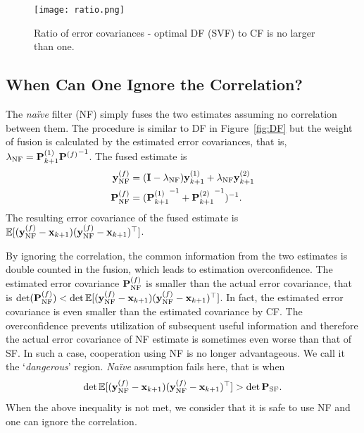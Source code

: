 \begin{figure}[htbp]
\centering
\texttt{[image: ratio.png]}
\caption{Ratio of error covariances - optimal DF (SVF) to CF is no larger than one.}
\label{ratio}
\end{figure}

\subsection{When Can One Ignore the Correlation?}
\label{sec:nf}
The \textit{na\"ive} filter (NF) simply fuses the two estimates assuming no correlation between them. The procedure is similar to DF in Figure~\ref{fig:DF} but the weight of fusion is calculated by the estimated error covariances, that is, $\lambda_\text{NF}={{\bf P}^{(1)}_{k+1}}{{\bf P}^{(f)}}^{-1}$. The fused estimate is
\begin{equation}
\begin{split}
{\bf y}^{(f)}_{\text{NF}}&=({\bf I}-\lambda_\text{NF}){\bf y}^{(1)}_{k+1}+\lambda_\text{NF}{\bf y}^{(2)}_{k+1} \\
{\bf P}^{(f)}_{\text{NF}}&=({{\bf P}^{(1)}_{k+1}}^{-1}+{{\bf P}^{(2)}_{k+1}}^{-1})^{-1}.
\end{split}
\end{equation}
The resulting error covariance of the fused estimate is $\mathbb{E}[({\bf y}^{(f)}_{\text{NF}}-{\bf x}_{k+1})({\bf y}^{(f)}_{\text{NF}}-{\bf x}_{k+1})^\top]$.

By ignoring the correlation, the common information from the two estimates is double counted in the fusion, which leads to estimation overconfidence. The estimated error covariance ${\bf P}^{(f)}_{\text{NF}}$ is smaller than the actual error covariance, that is $\det({\bf P}^{(f)}_{\text{NF}})<\det\mathbb{E}[({\bf y}^{(f)}_{\text{NF}}-{\bf x}_{k+1})({\bf y}^{(f)}_{\text{NF}}-{\bf x}_{k+1})^\top]$. In fact, the estimated error covariance is even smaller than the estimated covariance by CF. The overconfidence prevents utilization of subsequent useful information and therefore the actual error covariance of NF estimate is sometimes even worse than that of SF. In such a case, cooperation using NF is no longer advantageous. We call it the `\textit{dangerous}' region. \textit{Na\"ive} assumption fails here, that is when
\begin{equation}
\label{eq:nffail}
\det\mathbb{E}[({\bf y}^{(f)}_{\text{NF}}-{\bf x}_{k+1})({\bf y}^{(f)}_{\text{NF}}-{\bf x}_{k+1})^\top]>\det{\bf P}_{\text{SF}}.
\end{equation}
When the above inequality is not met, we consider that it is safe to use NF and one can ignore the correlation.

